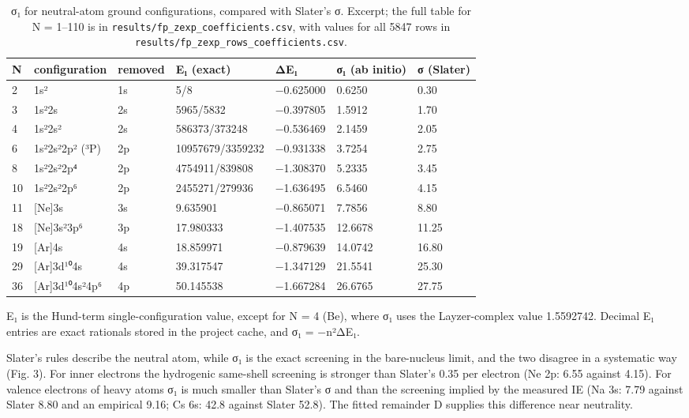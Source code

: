 \documentclass[aps,pra,preprint,superscriptaddress,amsmath,amssymb]{revtex4-2}
\begin{document}
\begin{table}[htbp]
\caption{σ₁ for neutral-atom ground configurations, compared with Slater's σ. Excerpt; the full table for N = 1–110 is in \texttt{results/fp\_zexp\_coefficients.csv}, with values for all 5847 rows in \texttt{results/fp\_zexp\_rows\_coefficients.csv}.}
\footnotesize
\begin{ruledtabular}
\begin{tabular}{lllllll}
N & configuration & removed & E₁ (exact) & ΔE₁ & σ₁ (ab initio) & σ (Slater) \\
\hline
2 & 1s² & 1s & 5/8 & −0.625000 & 0.6250 & 0.30 \\
3 & 1s²2s & 2s & 5965/5832 & −0.397805 & 1.5912 & 1.70 \\
4 & 1s²2s² & 2s & 586373/373248 & −0.536469 & 2.1459 & 2.05 \\
6 & 1s²2s²2p² (³P) & 2p & 10957679/3359232 & −0.931338 & 3.7254 & 2.75 \\
8 & 1s²2s²2p⁴ & 2p & 4754911/839808 & −1.308370 & 5.2335 & 3.45 \\
10 & 1s²2s²2p⁶ & 2p & 2455271/279936 & −1.636495 & 6.5460 & 4.15 \\
11 & [Ne]3s & 3s & 9.635901 & −0.865071 & 7.7856 & 8.80 \\
18 & [Ne]3s²3p⁶ & 3p & 17.980333 & −1.407535 & 12.6678 & 11.25 \\
19 & [Ar]4s & 4s & 18.859971 & −0.879639 & 14.0742 & 16.80 \\
29 & [Ar]3d¹⁰4s & 4s & 39.317547 & −1.347129 & 21.5541 & 25.30 \\
36 & [Ar]3d¹⁰4s²4p⁶ & 4p & 50.145538 & −1.667284 & 26.6765 & 27.75 \\
\end{tabular}
\end{ruledtabular}
\end{table}


E₁ is the Hund-term single-configuration value, except for N = 4 (Be), where σ₁ uses the Layzer-complex value 1.5592742. Decimal E₁ entries are exact rationals stored in the project cache, and σ₁ = −n²ΔE₁.


Slater's rules describe the neutral atom, while σ₁ is the exact screening in the bare-nucleus limit, and the two disagree in a systematic way (Fig. 3). For inner electrons the hydrogenic same-shell screening is stronger than Slater's 0.35 per electron (Ne 2p: 6.55 against 4.15). For valence electrons of heavy atoms σ₁ is much smaller than Slater's σ and than the screening implied by the measured IE (Na 3s: 7.79 against Slater 8.80 and an empirical 9.16; Cs 6s: 42.8 against Slater 52.8). The fitted remainder D supplies this difference near neutrality.
\end{document}

